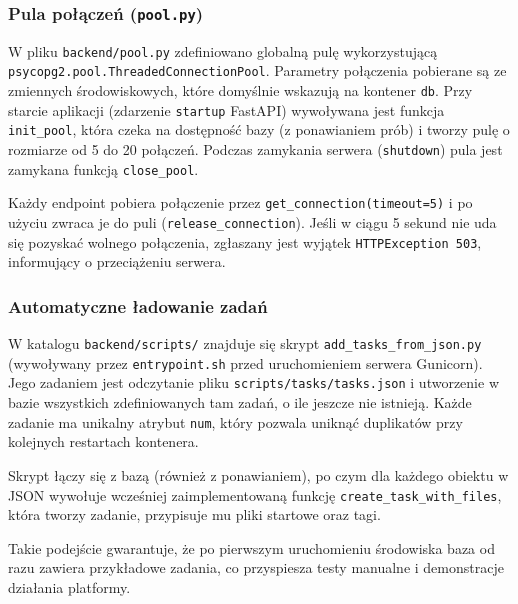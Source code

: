 \documentclass[12pt,a4paper]{article}
\begin{document}
\subsubsection*{Pula połączeń (\texttt{pool.py})}
W pliku \texttt{backend/pool.py} zdefiniowano globalną pulę wykorzystującą \newline \texttt{psycopg2.pool.ThreadedConnectionPool}. Parametry połączenia pobierane są ze zmiennych środowiskowych, które domyślnie wskazują na kontener \texttt{db}. Przy starcie aplikacji (zdarzenie \texttt{startup} FastAPI) wywoływana jest funkcja \texttt{init\_pool}, która czeka na dostępność bazy (z ponawianiem prób) i tworzy pulę o rozmiarze od 5 do 20 połączeń. Podczas zamykania serwera (\texttt{shutdown}) pula jest zamykana funkcją \texttt{close\_pool}.

Każdy endpoint pobiera połączenie przez \texttt{get\_connection(timeout=5)} i po użyciu zwraca je do puli (\texttt{release\_connection}). Jeśli w ciągu 5 sekund nie uda się pozyskać wolnego połączenia, zgłaszany jest wyjątek \texttt{HTTPException 503}, informujący o przeciążeniu serwera.

\subsubsection{Automatyczne ładowanie zadań}
W katalogu \texttt{backend/scripts/} znajduje się skrypt \texttt{add\_tasks\_from\_json.py} (wywoływany przez \texttt{entrypoint.sh} przed uruchomieniem serwera Gunicorn). Jego zadaniem jest odczytanie pliku \texttt{scripts/tasks/tasks.json} i utworzenie w bazie wszystkich zdefiniowanych tam zadań, o ile jeszcze nie istnieją. Każde zadanie ma unikalny atrybut \texttt{num}, który pozwala uniknąć duplikatów przy kolejnych restartach kontenera.

Skrypt łączy się z bazą (również z ponawianiem), po czym dla każdego obiektu w JSON wywołuje wcześniej zaimplementowaną funkcję \texttt{create\_task\_with\_files}, która tworzy zadanie, przypisuje mu pliki startowe oraz tagi.

Takie podejście gwarantuje, że po pierwszym uruchomieniu środowiska baza od razu zawiera przykładowe zadania, co przyspiesza testy manualne i demonstracje działania platformy.
\end{document}
